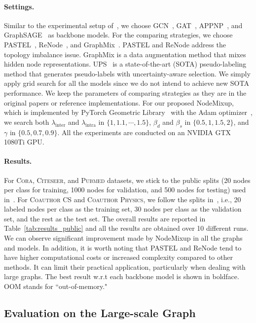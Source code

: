 \documentclass[letterpaper]{article} %
\begin{document}
\paragraph{Settings.}
 Similar to the experimental setup of~\cite{pastel}, we choose GCN~\cite{gcn}, GAT~\cite{gat}, APPNP~\cite{appnp}, and GraphSAGE~\cite{sage} as backbone models. For the comparing strategies, we choose PASTEL~\cite{pastel}, ReNode~\cite{renode}, and GraphMix~\cite{graphmix}. PASTEL and ReNode address the topology imbalance issue. GraphMix is a data augmentation method that mixes hidden node representations. UPS~\cite{ups} is a state-of-the-art (SOTA) pseudo-labeling method that generates pseudo-labels with uncertainty-aware selection. We simply apply grid search for all the models since we do not intend to achieve new SOTA performance. We keep the parameters of comparing strategies as they are in the original papers or reference implementations. For our proposed NodeMixup, which is implemented by PyTorch Geometric Library~\cite{torch_geo} with the Adam optimizer~\cite{adam}, we search both $\lambda_{\text{inter}}$ and $\lambda_{\text{intra}}$ in $\{1, 1.1, \cdots, 1.5\}$, $\beta_{d}$ and $\beta_{s}$ in $\{0.5, 1, 1.5, 2\}$, and $\gamma$ in $\{0.5, 0.7, 0.9\}$. All the experiments are conducted on an NVIDIA GTX 1080Ti GPU.

\paragraph{Results.}
For \textsc{Cora}, \textsc{Citeseer}, and \textsc{Pubmed} datasets, we stick to the public splits (20 nodes per class for training, 1000 nodes for validation, and 500 nodes for testing) used in~\cite{cora}. For \textsc{Coauthor CS} and \textsc{Coauthor Physics}, we follow the splits in~\cite{coauthor}, i.e., 20 labeled nodes per class as the training set, 30 nodes per class as the validation set, and the rest as the test set. The overall results are reported in Table~\ref{tab:results_public} and all the results are obtained over 10 different runs. We can observe significant improvement made by NodeMixup in all the graphs and models. In addition, it is worth noting that PASTEL and ReNode tend to have higher computational costs or increased complexity compared to other methods. It can limit their practical application, particularly when dealing with large graphs. The best result w.r.t each backbone model is shown in boldface. OOM stands for ``out-of-memory."

\subsection{Evaluation on the Large-scale Graph}
\end{document}
